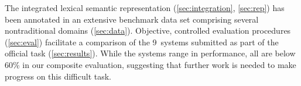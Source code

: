 \documentclass[11pt,letterpaper]{article}
\newcommand{\ensuretext}[1]{#1}
\newcommand{\nssmarker}{\ensuretext{\textcolor{magenta}{\ensuremath{^{\textsc{NS}}_{\textsc{S}}}}}}
\newcommand{\arkcomment}[3]{\ensuretext{\textcolor{#3}{[#1 #2]}}}
\newcommand{\nss}[1]{\arkcomment{\nssmarker}{#1}{magenta}}
\begin{document}
The integrated lexical semantic representation (\cref{sec:integration}, \cref{sec:rep})
has been annotated in an extensive benchmark data set comprising several nontraditional domains (\cref{sec:data}).
Objective, controlled evaluation procedures (\cref{sec:eval})
facilitate a comparison of the 9~systems submitted as part of the official task (\cref{sec:results}).
While the systems range in performance, all are below 60\% in our composite evaluation, 
suggesting that further work is needed to make progress on this difficult task.





\end{document}
